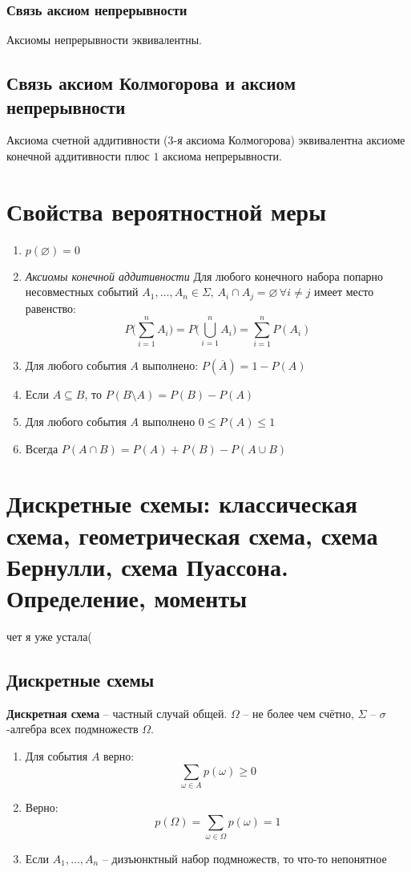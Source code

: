 \documentclass{article}
\begin{document}
\subsubsection{Связь аксиом непрерывности}
Аксиомы непрерывности эквивалентны.
\subsection{Связь аксиом Колмогорова и аксиом непрерывности}
Аксиома счетной аддитивности ($3$-я аксиома Колмогорова) эквивалентна аксиоме конечной аддитивности плюс $1$ аксиома непрерывности.
\newpage
\section{Свойства вероятностной меры}
\begin{enumerate}
    \item $p(\varnothing)=0$
    \item \textit{Аксиомы конечной аддитивности}  Для любого конечного набора попарно несовместных событий $A_1,\dots,A_n\in\Sigma,\,A_i\cap A_j=\varnothing\,\forall i\neq j$ имеет место равенство:
    $$ P\Big(\sum^n_{i=1}A_i\Big)=P\Big(\bigcup^n_{i=1}A_i\Big)=\sum^n_{i=1}P(A_i) $$
    \item Для любого события $A$ выполнено: $P(\overline{A})=1-P(A)$
    \item Если $A\subseteq B$, то $P(B\setminus A)=P(B)-P(A)$
    \item Для любого события $A$ выполнено $0\leq P(A)\leq 1$
    \item Всегда $P(A\cap B)=P(A)+P(B)-P(A\cup B)$
\end{enumerate}
\newpage
\section{Дискретные схемы: классическая схема, геометрическая схема, схема Бернулли, схема Пуассона. Определение, моменты}
чет я уже устала(
\subsection{Дискретные схемы}
\textbf{Дискретная схема} -- частный случай общей. $\Omega$ -- не более чем счётно, $\Sigma$ -- $\sigma$-алгебра всех подмножеств $\Omega$.
\begin{enumerate}
    \item Для события $A$ верно: $$ \sum_{\omega\in A}p(\omega)\geq 0 $$
    \item Верно: $$ p(\Omega)=\sum_{\omega\in\Omega}p(\omega)=1 $$
    \item Если $A_1,\dots,A_n$ -- дизъюнктный набор подмножеств, то что-то непонятное
\end{enumerate}
\end{document}
